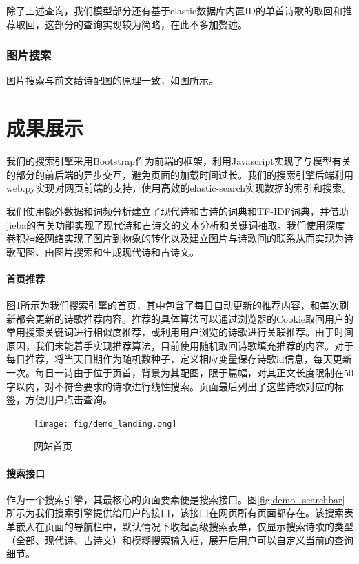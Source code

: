 \documentclass[a4paper, 10pt]{article}
\begin{document}
除了上述查询，我们模型部分还有基于elastic数据库内置ID的单首诗歌的取回和推荐取回，这部分的查询实现较为简略，在此不多加赘述。

\subsubsection{图片搜索}
图片搜索与前文给诗配图的原理一致，如图所示。

\section{成果展示}
我们的搜索引擎采用Bootstrap作为前端的框架，利用Javascript实现了与模型有关的部分的前后端的异步交互，避免页面的加载时间过长。我们的搜索引擎后端利用web.py实现对网页前端的支持，使用高效的elastic-search实现数据的索引和搜索。

我们使用额外数据和词频分析建立了现代诗和古诗的词典和TF-IDF词典，并借助jieba的有关功能实现了现代诗和古诗文的文本分析和关键词抽取。我们使用深度卷积神经网络实现了图片到物象的转化以及建立图片与诗歌间的联系从而实现为诗歌配图、由图片搜索和生成现代诗和古诗文。

\paragraph*{首页推荐} 图\ref{fig:demo_landing}所示为我们搜索引擎的首页，其中包含了每日自动更新的推荐内容，和每次刷新都会更新的诗歌推荐内容。推荐的具体算法可以通过浏览器的Cookie取回用户的常用搜索关键词进行相似度推荐，或利用用户浏览的诗歌进行关联推荐。由于时间原因，我们未能着手实现推荐算法，目前使用随机取回诗歌填充推荐的内容。对于每日推荐，将当天日期作为随机数种子，定义相应变量保存诗歌id信息，每天更新一次。每日一诗由于位于页首，背景为其配图，限于篇幅，对其正文长度限制在50字以内，对不符合要求的诗歌进行线性搜索。页面最后列出了这些诗歌对应的标签，方便用户点击查询。

\begin{figure}[H]
\centering
\texttt{[image: fig/demo\_landing.png]}
\caption{网站首页}
\label{fig:demo_landing}
\end{figure}

\paragraph*{搜索接口} 作为一个搜索引擎，其最核心的页面要素便是搜索接口。图\ref{fig:demo_searchbar}所示为我们搜索引擎提供给用户的接口，该接口在网页所有页面都存在。该搜索表单嵌入在页面的导航栏中，默认情况下收起高级搜索表单，仅显示搜索诗歌的类型（全部、现代诗、古诗文）和模糊搜索输入框，展开后用户可以自定义当前的查询细节。
\end{document}

